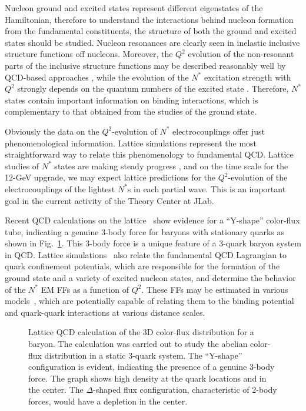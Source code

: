 Nucleon ground and excited states represent different eigenstates of the 
Hamiltonian, therefore to understand the interactions behind nucleon 
formation from the fundamental constituents, the structure of both the 
ground and excited states should be studied. Nucleon resonances are clearly 
seen in inelastic inclusive structure functions off nucleons.  Moreover, 
the $Q^2$ evolution of the non-resonant parts of the inclusive structure 
functions may be described reasonably well by QCD-based approaches
\cite{Me05}, while the evolution of the $N^*$ excitation strength with 
$Q^2$ strongly depends on the quantum numbers of the excited state
\cite{Bur1}.  Therefore, $N^*$ states contain important 
information on binding interactions, which is complementary to that 
obtained from the studies of the ground state.  

Obviously the data on the $Q^2$-evolution of $N^*$ electrocouplings offer 
just phenomenological information.  Lattice simulations represent the most 
straightforward way to relate this phenomenology to fundamental QCD. Lattice 
studies of $N^*$ states are making steady progress 
\cite{Ri05,Me03,Burc04,alexandrou03,alexandrou04}, and on the time scale for 
the 12-GeV upgrade, we may expect lattice predictions for the $Q^2$-evolution 
of the electrocouplings of the lightest $N^*$s in each partial wave. This is 
an important goal in the current activity of the Theory Center at JLab.

Recent QCD calculations on the lattice~\cite{ichie02} show evidence 
for a ``Y-shape'' color-flux tube, indicating a genuine 3-body force 
for baryons with stationary quarks as shown in Fig.~\ref{fig:mercedes}.
This 3-body force is a unique feature of a 3-quark baryon system in QCD.
Lattice simulations~\cite{Ta04} also relate the fundamental QCD Lagrangian 
to quark confinement potentials, which are responsible for the formation 
of the ground state and a variety of excited nucleon states, and determine 
the behavior of the $N^*$ EM FFs as a function of $Q^2$.  These FFs may 
be estimated in various models~\cite{Az90,Ca95,aiello98,CRob06,me02}, which 
are potentially capable of relating them to the binding potential and 
quark-quark interactions at various distance scales. 

\begin{figure}[ht]
\vspace{5.1cm}
\caption{\small{Lattice QCD calculation of the 3D color-flux distribution 
for a baryon. The calculation was carried out to study the abelian color-flux 
distribution in a static 3-quark system. The ``Y-shape'' configuration is 
evident, indicating the presence of a genuine 3-body force. The graph shows 
high density at the quark locations and in the center. The $\Delta$-shaped 
flux configuration, characteristic of 2-body forces, would have a depletion 
in the center.}}
\label{fig:mercedes}
\end{figure}


